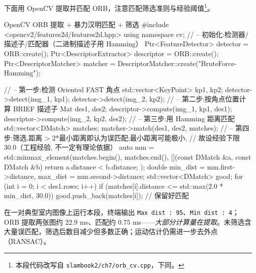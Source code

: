 \begin{practice}
下面用 OpenCV 提取并匹配 ORB，注意匹配筛选准则与经验阈值\footnote{本段代码改写自 \texttt{slambook2/\allowbreak ch7/\allowbreak orb\_cv.\allowbreak cpp}\cite{gaoxiang2019slam14}，下同。}。
\begin{codebox}[C++]{OpenCV ORB 提取 + 暴力汉明匹配 + 筛选}
#include <opencv2/features2d/features2d.hpp>
using namespace cv;
// -- 初始化:检测器/描述子/匹配器（二进制描述子用 Hamming）
Ptr<FeatureDetector>   detector  = ORB::create();
Ptr<DescriptorExtractor> descriptor = ORB::create();
Ptr<DescriptorMatcher> matcher = DescriptorMatcher::create("BruteForce-Hamming");

// -- 第一步:检测 Oriented FAST 角点
std::vector<KeyPoint> kp1, kp2;
detector->detect(img_1, kp1);
detector->detect(img_2, kp2);
// -- 第二步:按角点位置计算 BRIEF 描述子
Mat des1, des2;
descriptor->compute(img_1, kp1, des1);
descriptor->compute(img_2, kp2, des2);
// -- 第三步:用 Hamming 距离匹配
std::vector<DMatch> matches;
matcher->match(des1, des2, matches);
// -- 第四步:筛选.距离 > 2*最小距离即认为误匹配;最小距离可能极小,
//    故设经验下限 30.0（工程经验, 不一定有理论依据）
auto mm = std::minmax_element(matches.begin(), matches.end(),
    [](const DMatch &a, const DMatch &b){ return a.distance < b.distance; });
double min_dist = mm.first->distance, max_dist = mm.second->distance;
std::vector<DMatch> good;
for (int i = 0; i < des1.rows; i++)
    if (matches[i].distance <= std::max(2.0 * min_dist, 30.0))
        good.push_back(matches[i]);   // 保留好匹配
\end{codebox}
在一对典型室内图像上运行本段，终端输出 \texttt{Max dist : 95}、\texttt{Min dist : 4}；ORB 提取两张图约 $22.9$ ms、匹配约 $0.75$ ms——\emph{大部分计算量在提取}。未筛选含大量误匹配，筛选后数目减少但多数正确；运动估计仍需进一步去外点（RANSAC）。
\end{practice}

